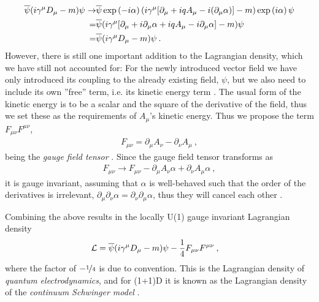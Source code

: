 \documentclass[../main.tex]{subfiles} %
\begin{document}
\begin{align}
\begin{split}
    \psibar (i \gamma^\mu D_\mu - m) \psi \rightarrow
        & \psibar \exp{-i\alpha} (i \gamma^\mu [\partial_\mu + iqA_\mu - i(\partial_\mu\alpha)] - m) \exp{i\alpha} \psi \\
        =& \psibar (i \gamma^\mu [\partial_\mu + i \partial_\mu \alpha + iqA_\mu - i\partial_\mu\alpha] - m) \psi \\
        =& \psibar (i \gamma^\mu D_\mu - m) \psi \: .
\end{split}
\end{align}
However, there is still one important addition to the Lagrangian density, which we have still not accounted for: For the newly introduced vector field we have only introduced its coupling to the already existing field, $\psi$, but we also need to include its own ''free'' term, i.e. its kinetic energy term \cite{griffiths_introToElementaryParticles_2008}. The usual form of the kinetic energy is to be a scalar and the square of the derivative of the field, thus we set these as the requirements of $A_\mu$'s kinetic energy. Thus we propose the term $F_{\mu\nu}F^{\mu\nu}$,
\begin{align}
    F_{\mu\nu} = \partial_\mu A_\nu - \partial_\nu A_\mu \: ,
\end{align}
being the \emph{gauge field tensor} \cite{griffiths_introToEldyn_2017}. Since the gauge field tensor transforms as
\begin{align}
    F_{\mu\nu} \rightarrow F_{\mu\nu} - \partial_\mu A_\nu \alpha + \partial_\nu A_\mu \alpha \: ,
\end{align}
it is gauge invariant, assuming that $\alpha$ is well-behaved such that the order of the derivatives is irrelevant, $\partial_\mu\partial_\nu\alpha = \partial_\nu\partial_\mu\alpha$, thus they will cancel each other \cite{panyella_masterThesis_2019}.

Combining the above results in the locally U(1) gauge invariant Lagrangian density
\begin{align} \label{eq:ContinuumSchwingerModelLagrangianDensity}
    \mathcal{L} &= \overline{\psi} (i \gamma^\mu D_\mu - m) \psi - \frac{1}{4}F_{\mu\nu}F^{\mu\nu} \: ,
\end{align}
where the factor of $-\nicefrac{1}{4}$ is due to convention. This is the Lagrangian density of \emph{quantum electrodynamics}, and for (1+1)D it is known as the Lagrangian density of the \emph{continuum Schwinger model} \cite{melnikov_latticeSchwingerModel_2000, buyens_confinementAndStringBreaking_2016}.
\end{document}
